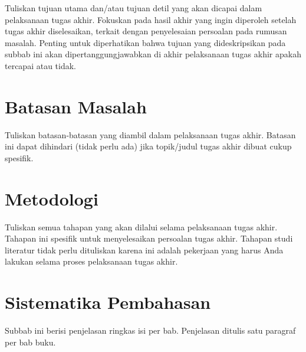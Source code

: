 \documentclass[../index.tex]{subfiles}
\begin{document}
Tuliskan tujuan utama dan/atau tujuan detil yang akan dicapai dalam pelaksanaan tugas akhir. Fokuskan pada hasil akhir yang ingin diperoleh setelah tugas akhir diselesaikan, terkait dengan penyelesaian persoalan pada rumusan masalah. Penting untuk diperhatikan bahwa tujuan yang dideskripsikan pada subbab ini akan dipertanggungjawabkan di akhir pelaksanaan tugas akhir apakah tercapai atau tidak.

\section{Batasan Masalah}

Tuliskan batasan-batasan yang diambil dalam pelaksanaan tugas akhir. Batasan ini dapat dihindari (tidak perlu ada) jika topik/judul tugas akhir dibuat cukup spesifik.

\section{Metodologi}

Tuliskan semua tahapan yang akan dilalui selama pelaksanaan tugas akhir. Tahapan ini spesifik untuk menyelesaikan persoalan tugas akhir. Tahapan studi literatur tidak perlu dituliskan karena ini adalah pekerjaan yang harus Anda lakukan selama proses pelaksanaan tugas akhir.

\section{Sistematika Pembahasan}

Subbab ini berisi penjelasan ringkas isi per bab. Penjelasan ditulis satu paragraf per bab buku.
\end{document}
